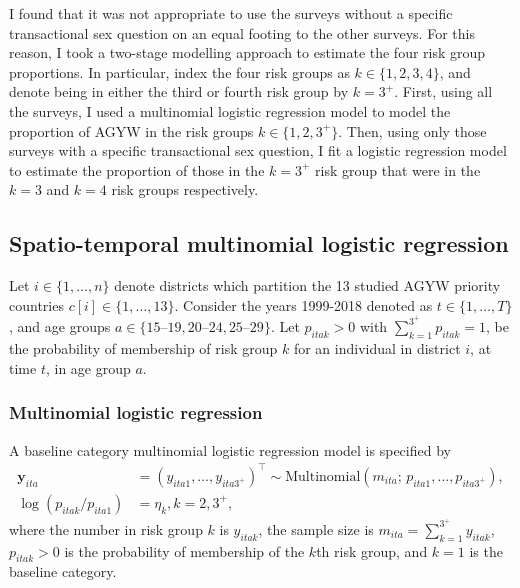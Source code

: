\documentclass[a4paper, nobind]{templates/ociamthesis}
\newcommand{\y}{\mathbf{y}}
\begin{document}
I found that it was not appropriate to use the surveys without a specific transactional sex question on an equal footing to the other surveys.
For this reason, I took a two-stage modelling approach to estimate the four risk group proportions.
In particular, index the four risk groups as \(k \in \{1, 2, 3, 4\}\), and denote being in either the third or fourth risk group by \(k = 3^{+}\).
First, using all the surveys, I used a multinomial logistic regression model to model the proportion of AGYW in the risk groups \(k \in \{1, 2, 3^{+}\}\).
Then, using only those surveys with a specific transactional sex question, I fit a logistic regression model to estimate the proportion of those in the \(k = 3^{+}\) risk group that were in the \(k = 3\) and \(k = 4\) risk groups respectively.

\hypertarget{spatio-temporal-multinomial-logistic-regression}{%
\subsection{Spatio-temporal multinomial logistic regression}\label{spatio-temporal-multinomial-logistic-regression}}

Let \(i \in \{1, \ldots, n\}\) denote districts which partition the 13 studied AGYW priority countries \(c[i] \in \{1, \ldots, 13\}\).
Consider the years 1999-2018 denoted as \(t \in \{1, \ldots, T\}\), and age groups \(a \in \{\text{15--19}, \text{20--24}, \text{25--29}\}\).
Let \(p_{itak} > 0\) with \(\sum_{k = 1}^{3^{+}} p_{itak} = 1\), be the probability of membership of risk group \(k\) for an individual in district \(i\), at time \(t\), in age group \(a\).

\hypertarget{multinomial-logistic-regression}{%
\subsubsection{Multinomial logistic regression}\label{multinomial-logistic-regression}}

A baseline category multinomial logistic regression model is specified by
\begin{align}
    \y_{ita} &= (y_{ita1}, \ldots, y_{ita3^{+}})^\top \sim \text{Multinomial}(m_{ita}; \, p_{ita1}, \ldots, p_{ita3^{+}}), \\
    \log(p_{itak} / p_{ita1}) &= \eta_k, k = 2, 3^{+},
\end{align}
where the number in risk group \(k\) is \(y_{itak}\), the sample size is \(m_{ita} = \sum_{k = 1}^{3^{+}} y_{itak}\), \(p_{itak} > 0\) is the probability of membership of the \(k\)th risk group, and \(k = 1\) is the baseline category.
\end{document}
